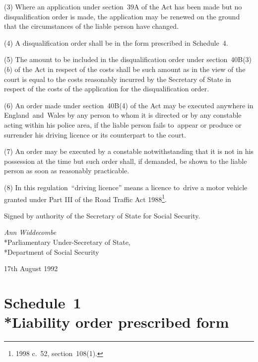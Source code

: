 \documentclass[12pt,a4paper]{article}
\begin{document}
(3) Where an application under section~39A of the Act has been made but no disqualification order is made, the application may be renewed on the ground that the circumstances of the liable person have changed.

(4) A disqualification order shall be in the form prescribed in Schedule~4.

(5) The amount to be included in the disqualification order under section~40B(3)($b$)  of the Act in respect of the costs shall be such amount as in the view of the court is equal to the costs reasonably incurred by the Secretary of State in respect of the costs of the application for the disqualification order.

(6) An order made under section~40B(4) of the Act may be executed anywhere in England~and~Wales by any person to whom it is directed or by any constable acting within his police area, if the liable person fails to~appear or produce or surrender his driving licence or its counterpart to the court.

(7) An order may be executed by a constable notwithstanding that it is not in his possession at the time but such order shall, if demanded, be shown to the liable person as soon as reasonably practicable.

(8) In this regulation~“driving licence” means a licence to~drive a motor vehicle granted under Part III of the Road Traffic Act 1988\footnote{1998 c.\ 52, section~108(1).}.


\bigskip

Signed by authority of the Secretary of State for Social Security.

{\raggedleft
\emph{Ann Widdecombe}\\*Parliamentary Under-Secretary of State,\\*Department of Social Security

}

17th August 1992

\small

\part[Schedule~1 --- Liability order prescribed form]{Schedule~1\\*Liability order prescribed form}
\end{document}
